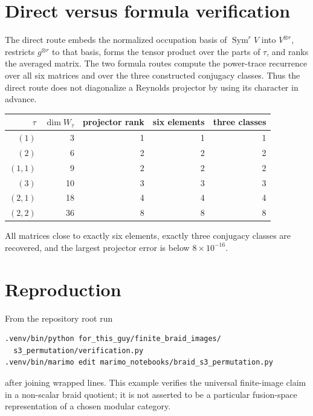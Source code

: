 \documentclass[11pt]{article}
\begin{document}
\section{Direct versus formula verification}
The direct route embeds the normalized occupation basis of
$\operatorname{Sym}^rV$ into $V^{\otimes r}$, restricts $g^{\otimes r}$
to that basis, forms the tensor product over the parts of $\tau$, and ranks
the averaged matrix.  The two formula routes compute the power-trace
recurrence over all six matrices and over the three constructed conjugacy
classes.  Thus the direct route does not diagonalize a Reynolds projector by
using its character in advance.

\begin{center}
\begin{tabular}{@{}rrrrr@{}}\toprule
$\tau$&$\dim W_\tau$&projector rank&six elements&three classes\\\midrule
$(1)$&3&1&1&1\\
$(2)$&6&2&2&2\\
$(1,1)$&9&2&2&2\\
$(3)$&10&3&3&3\\
$(2,1)$&18&4&4&4\\
$(2,2)$&36&8&8&8\\\bottomrule
\end{tabular}
\end{center}
All matrices close to exactly six elements, exactly three conjugacy classes
are recovered, and the largest projector error is below $8\times10^{-16}$.

\section{Reproduction}
From the repository root run
\begin{verbatim}
.venv/bin/python for_this_guy/finite_braid_images/
  s3_permutation/verification.py
.venv/bin/marimo edit marimo_notebooks/braid_s3_permutation.py
\end{verbatim}
after joining wrapped lines.  This example verifies the universal finite-image
claim in a non-scalar braid quotient; it is not asserted to be a particular
fusion-space representation of a chosen modular category.
\end{document}
